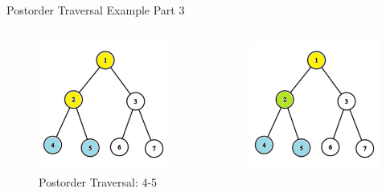 \documentclass[aspectratio=169]{beamer}%
\begin{document}
\begin{frame}{Postorder Traversal Example Part 3}
    \begin{columns}
        \begin{column}{0.32\textwidth}
            \begin{figure}
                \centering
                \includegraphics[width = .9\linewidth]{tree-post 7.png}
                \caption{Postorder Traversal: 4-5}
            \end{figure}
        \end{column}
        \hfill
        \begin{column}{0.32\textwidth}
            \begin{figure}
                \centering
                \includegraphics[width = .9\linewidth]{tree-post 8.png}

\end{figure}
\end{column}
\end{columns}
\end{frame}
\end{document}
